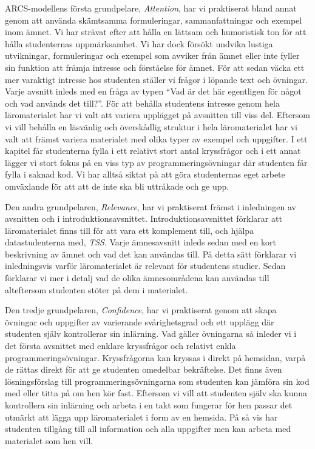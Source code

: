 \documentclass[]{article}
\begin{document}
ARCS-modellens första grundpelare, \textit{Attention}, har vi praktiserat bland annat genom att använda
skämtsamma formuleringar, sammanfattningar och exempel inom ämnet. Vi har strävat efter att hålla en
lättsam och humoristisk ton för att hålla studenternas uppmärksamhet. Vi har dock försökt undvika
lustiga utvikningar, formuleringar och exempel som avviker från ämnet eller inte fyller sin funktion
att främja intresse och förståelse för ämnet. För att sedan väcka ett mer varaktigt intresse hos
studenten ställer vi frågor i löpande text och övningar. Varje avsnitt inleds med en fråga av typen
“Vad är det här egentligen för något och vad används det till?”. För att behålla studentens intresse
genom hela läromaterialet har vi valt att variera upplägget på avsnitten till viss del. Eftersom vi
vill behålla en läsvänlig och överskådlig struktur i hela läromaterialet har vi valt att främst variera
materialet med olika typer av exempel och uppgifter. I ett kapitel får studenterna fylla i ett relativt
stort antal kryssfrågor och i ett annat lägger vi stort fokus på en viss typ av programmeringsövningar
där studenten får fylla i saknad kod. Vi har alltså siktat på att göra studenternas eget arbete
omväxlande för att att de inte ska bli uttråkade och ge upp.

Den andra grundpelaren, \textit{Relevance}, har vi praktiserat främst i inledningen av avsnitten och i
introduktionsavsnittet. Introduktionsavsnittet förklarar att läromaterialet finns till för att vara ett
komplement till, och hjälpa datastudenterna med, \textit{TSS}. Varje ämnesavsnitt inleds sedan med en kort
beskrivning av ämnet och vad det kan användas till. På detta sätt förklarar vi inledningsvis varför
läromaterialet är relevant för studentens studier. Sedan förklarar vi mer i detalj vad de olika
ämnesområdena kan användas till alteftersom studenten stöter på dem i materialet.

Den tredje grundpelaren, \textit{Confidence}, har vi praktiserat genom att skapa övningar och uppgifter
av varierande svårighetsgrad och ett upplägg där studenten själv kontrollerar sin inlärning. Vad gäller
övningarna så inleder vi i det första avsnittet med enklare kryssfrågor och relativt enkla
programmeringsövningar. Kryssfrågorna kan kryssas i direkt på hemsidan, varpå de rättas direkt för att
ge studenten omedelbar bekräftelse. Det finns även lösningsförslag till programmeringsövningarna som
studenten kan jämföra sin kod med eller titta på om hen kör fast. Eftersom vi vill att studenten själv
ska kunna kontrollera sin inlärning och arbeta i en takt som fungerar för hen passar det utmärkt att
lägga upp läromaterialet i form av en hemsida. På så vis har studenten tillgång till all information och
alla uppgifter men kan arbeta med materialet som hen vill.
\end{document}
